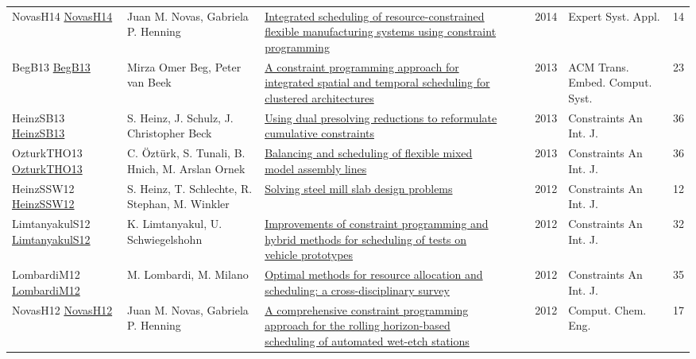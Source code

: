 {\begin{longtable}{p{3cm}p{6cm}p{7cm}rrrp{3cm}r}
NovasH14 \href{https://doi.org/10.1016/j.eswa.2013.09.026}{NovasH14} & Juan M. Novas, Gabriela P. Henning & \href{articles/NovasH14.pdf}{Integrated scheduling of resource-constrained flexible manufacturing systems using constraint programming} &  & \cite{NovasH14} & 2014 & Expert Syst. Appl. & 14\\
BegB13 \href{http://doi.acm.org/10.1145/2512470}{BegB13} & Mirza Omer Beg, Peter van Beek & \href{}{A constraint programming approach for integrated spatial and temporal scheduling for clustered architectures} &  & \cite{BegB13} & 2013 & {ACM} Trans. Embed. Comput. Syst. & 23\\
HeinzSB13 \href{https://doi.org/10.1007/s10601-012-9136-9}{HeinzSB13} & S. Heinz, J. Schulz, J. Christopher Beck & \href{articles/HeinzSB13.pdf}{Using dual presolving reductions to reformulate cumulative constraints} &  & \cite{HeinzSB13} & 2013 & Constraints An Int. J. & 36\\
OzturkTHO13 \href{https://doi.org/10.1007/s10601-013-9142-6}{OzturkTHO13} & C. {\"{O}}zt{\"{u}}rk, S. Tunali, B. Hnich, M. Arslan Ornek & \href{articles/OzturkTHO13.pdf}{Balancing and scheduling of flexible mixed model assembly lines} &  & \cite{OzturkTHO13} & 2013 & Constraints An Int. J. & 36\\
HeinzSSW12 \href{https://doi.org/10.1007/s10601-011-9113-8}{HeinzSSW12} & S. Heinz, T. Schlechte, R. Stephan, M. Winkler & \href{articles/HeinzSSW12.pdf}{Solving steel mill slab design problems} &  & \cite{HeinzSSW12} & 2012 & Constraints An Int. J. & 12\\
LimtanyakulS12 \href{https://doi.org/10.1007/s10601-012-9118-y}{LimtanyakulS12} & K. Limtanyakul, U. Schwiegelshohn & \href{articles/LimtanyakulS12.pdf}{Improvements of constraint programming and hybrid methods for scheduling of tests on vehicle prototypes} &  & \cite{LimtanyakulS12} & 2012 & Constraints An Int. J. & 32\\
LombardiM12 \href{https://doi.org/10.1007/s10601-011-9115-6}{LombardiM12} & M. Lombardi, M. Milano & \href{articles/LombardiM12.pdf}{Optimal methods for resource allocation and scheduling: a cross-disciplinary survey} &  & \cite{LombardiM12} & 2012 & Constraints An Int. J. & 35\\
NovasH12 \href{https://doi.org/10.1016/j.compchemeng.2012.01.005}{NovasH12} & Juan M. Novas, Gabriela P. Henning & \href{articles/NovasH12.pdf}{A comprehensive constraint programming approach for the rolling horizon-based scheduling of automated wet-etch stations} &  & \cite{NovasH12} & 2012 & Comput. Chem. Eng. & 17\\

\end{longtable}}
